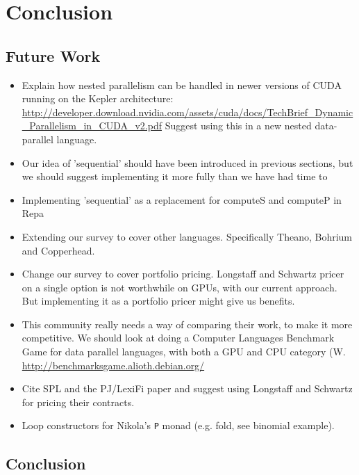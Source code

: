 
\chapter{Conclusion}
\label{chap:Conclusion}
\section{Future Work}

\begin{itemize}
\item Explain how nested parallelism can be handled in newer versions
  of CUDA running on the Kepler architecture:
  \url{http://developer.download.nvidia.com/assets/cuda/docs/TechBrief_Dynamic_Parallelism_in_CUDA_v2.pdf}
  Suggest using this in a new nested data-parallel language.

\item Our idea of 'sequential' should have been introduced in previous
  sections, but we should suggest implementing it more fully than we
  have had time to

\item Implementing 'sequential' as a replacement for computeS and
  computeP in Repa

\item Extending our survey to cover other languages. Specifically
  Theano, Bohrium and Copperhead.

\item Change our survey to cover portfolio pricing. Longstaff and
  Schwartz pricer on a single option is not worthwhile on GPUs, with
  our current approach. But implementing it as a portfolio pricer
  might give us benefits.

\item This community really needs a way of comparing their work, to
  make it more competitive. We should look at doing a Computer
  Languages Benchmark Game for data parallel languages, with both a
  GPU and CPU category (W. \url{http://benchmarksgame.alioth.debian.org/}

\item Cite SPL and the PJ/LexiFi paper and suggest using Longstaff and
  Schwartz for pricing their contracts.
\item Loop constructors for Nikola's \texttt{P} monad (e.g. fold, see binomial example).
\end{itemize}

\section{Conclusion}


